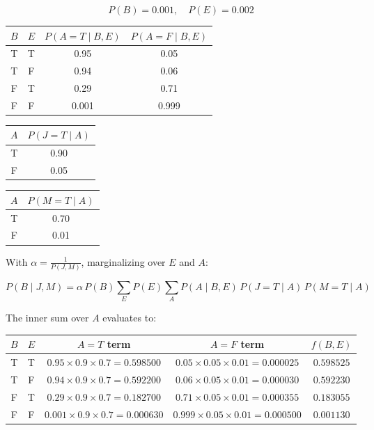 \documentclass[12pt]{article}
\begin{document}
\[
P(B)=0.001,\quad P(E)=0.002
\]

\begin{center}
\begin{tabular}{cccc}
\toprule
$B$ & $E$ & $P(A{=}T\mid B,E)$ & $P(A{=}F\mid B,E)$\\
\midrule
T & T & 0.95 & 0.05\\
T & F & 0.94 & 0.06\\
F & T & 0.29 & 0.71\\
F & F & 0.001 & 0.999\\
\bottomrule
\end{tabular}
\qquad
\begin{tabular}{cc}
\toprule
$A$ & $P(J{=}T\mid A)$\\
\midrule
T & 0.90\\
F & 0.05\\
\bottomrule
\end{tabular}
\qquad
\begin{tabular}{cc}
\toprule
$A$ & $P(M{=}T\mid A)$\\
\midrule
T & 0.70\\
F & 0.01\\
\bottomrule
\end{tabular}
\end{center}

With $\alpha=\tfrac{1}{P(J,M)}$, marginalizing over $E$ and $A$:

\[
P(B\mid J,M)
=\alpha\,P(B)\sum_{E}P(E)\sum_{A}P(A\mid B,E)\,P(J{=}T\mid A)\,P(M{=}T\mid A)
\]

The inner sum over $A$ evaluates to:

\begin{center}
\begin{tabular}{ccccc}
\toprule
$B$ & $E$ & $A{=}T$ term & $A{=}F$ term & $f(B,E)$\\
\midrule
T & T & $0.95\times0.9\times0.7=0.598500$ & $0.05\times0.05\times0.01=0.000025$ & $0.598525$\\
T & F & $0.94\times0.9\times0.7=0.592200$ & $0.06\times0.05\times0.01=0.000030$ & $0.592230$\\
F & T & $0.29\times0.9\times0.7=0.182700$ & $0.71\times0.05\times0.01=0.000355$ & $0.183055$\\
F & F & $0.001\times0.9\times0.7=0.000630$ & $0.999\times0.05\times0.01=0.000500$ & $0.001130$\\
\bottomrule
\end{tabular}
\end{center}
\end{document}
